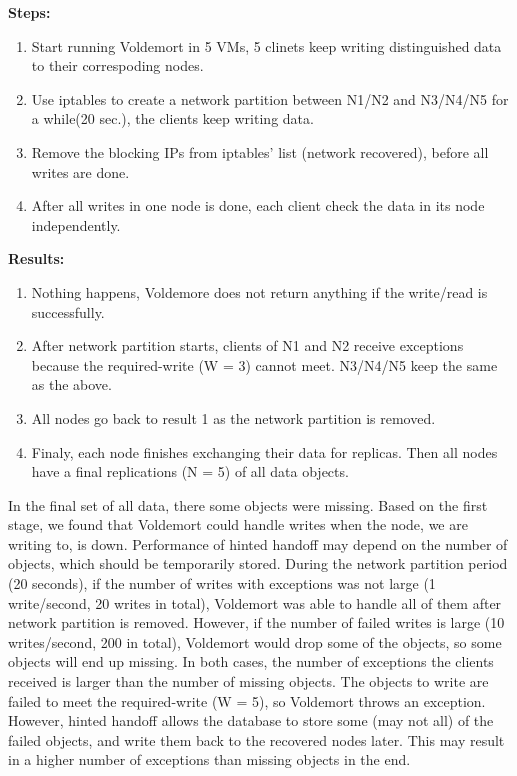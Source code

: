 \documentclass[a4paper]{article}
\begin{document}
{\bf Steps:}
\begin{enumerate}
  \item Start running Voldemort in 5 VMs, 5 clinets keep writing distinguished data to their correspoding nodes.
  \item Use iptables to create a network partition between N1/N2 and N3/N4/N5 for a while(20 sec.), the clients keep writing data.
  \item Remove the blocking IPs from iptables' list (network recovered), before all writes are done.
  \item After all writes in one node is done, each client check the data in its node independently.
\end{enumerate}

{\bf Results:}
\begin{enumerate}
  \item Nothing happens, Voldemore does not return anything if the write/read is successfully.
  \item After network partition starts, clients of N1 and N2 receive exceptions because the required-write (W = 3) cannot meet. N3/N4/N5 keep the same as the above. 
  \item All nodes go back to result 1 as the network partition is removed.
  \item Finaly, each node finishes exchanging their data for replicas. Then all nodes have a final replications (N = 5) of all data objects.
\end{enumerate}

In the final set of all data, there some objects were missing. 
Based on the first stage, we found that Voldemort could handle writes when the node, we are writing to, is down. 
Performance of hinted handoff may depend on the number of objects, which should be temporarily stored. 
During the network partition period (20 seconds), if the number of writes with exceptions was not large (1 write/second, 20 writes in total), Voldemort was able to handle all of them after network partition is removed. 
However, if the number of failed writes is large (10 writes/second, 200 in total), Voldemort would drop some of the objects, so some objects will end up missing. 
In both cases, the number of exceptions the clients received is larger than the number of missing objects. 
The objects to write are failed to meet the required-write (W = 5), so Voldemort throws an exception. 
However, hinted handoff allows the database to store some (may not all) of the failed objects, and write them back to the recovered nodes later. 
This may result in a higher number of exceptions than missing objects in the end.
\end{document}
